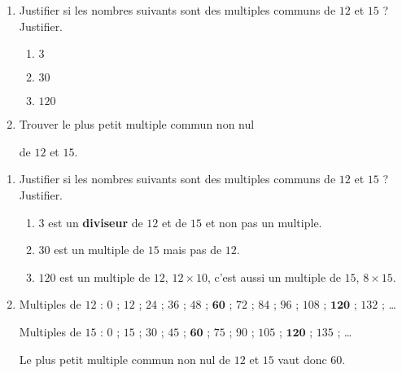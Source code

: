 \begin{exercice*}
    \begin{enumerate}
        \item Justifier si les nombres suivants sont des multiples communs de $12$ et $15$ ? Justifier.
        \begin{enumerate}
            \item $3$
            \item $30$
            \item $120$
        \end{enumerate}
        \item Trouver le plus petit multiple commun non nul 
        
        de $12$ et $15$.
    \end{enumerate}
\end{exercice*}
\begin{corrige}
    \begin{enumerate}
        \item Justifier si les nombres suivants sont des multiples communs de $12$ et $15$ ? Justifier.
        
        \begin{enumerate}
            \item $3$ est un \textbf{diviseur} de $12$ et de $15$ et non pas un multiple.
            \item $30$ est un multiple de $15$ mais pas de $12$.
            \item $120$ est un multiple de $12$, $12\times 10$, c'est aussi un multiple de $15$, $8\times 15$.
        \end{enumerate}
        \setcounter{enumi}{1}
        \item Multiples de $12$ : \sout{$0$} ; $12$ ; $24$ ; $36$ ; $48$ ; $\mathbf{60}$ ; $72$ ; $84$ ; $96$ ; $108$ ; $\mathbf{120}$ ; $132$ ; \dots
        
        Multiples de $15$ : \sout{$0$} ; $15$ ; $30$ ; $45$ ; $\mathbf{60}$ ; $75$ ; $90$ ; $105$ ; $\mathbf{120}$ ; $135$ ; \dots

        Le plus petit multiple commun non nul de $12$ et $15$ vaut donc $60$.
    \end{enumerate}
\end{corrige}

